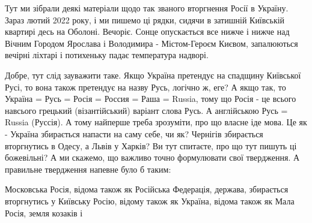  
 
 
 
 

Тут ми зібрали деякі матеріали щодо так званого вторгнення Росії в Україну.
Зараз лютий 2022 року, і ми пишемо ці рядки, сидячи в затишній Київській
квартирі десь на Оболоні. Вечоріє. Сонце опускається все нижче і нижче над
Вічним Городом Ярослава і Володимира - Містом-Героєм Києвом, запалюються
вечірні ліхтарі і потихеньку падає температура надворі.

Добре, тут слід зауважити таке. Якщо Україна претендує на спадщину Київської
Русі, то вона також претендує на назву Русь, логічно ж, еге? А якщо так, то
Україна = Русь = Росія = Россия = Раша = Russia, тому що Росія - це всього
навсього грецький (візантійський) варіант слова Русь. А англійською Русь =
Russia (Руссія). А тому найперше треба зрозуміти, про що власне іде мова. Це як
- Україна збирається напасти на саму себе, чи як?  Чернігів збирається
вторгнутись в Одесу, а Львів у Харків? Ви тут спитаєте, про що тут пишуть ці
божевільні?  А ми скажемо, що важливо точно формулювати свої твердження. А
правильне твердження напевне було б таким:

Московська Росія, відома також як Російська Федерація, держава, збирається
вторгнутись у Київську Росію, відому також як Україна, відома також як Мала
Росія, земля козаків і 

